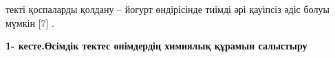 текті қоспаларды қолдану -- йогурт өндірісінде тиімді әрі қауіпсіз әдіс
болуы мүмкін {[}7{]} .

{\bfseries 1- кесте.Өсімдік тектес өнімдердің химиялық құрамын салыстыру}


